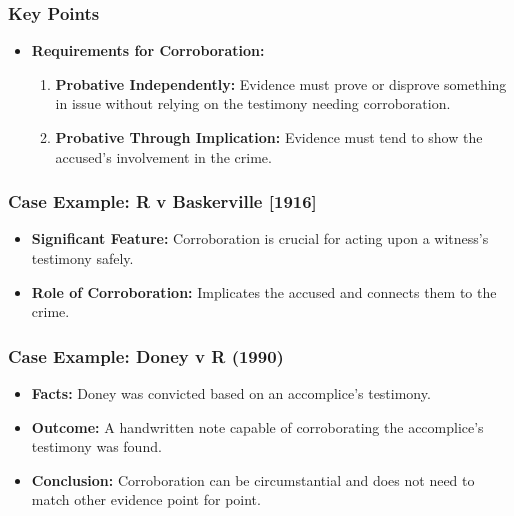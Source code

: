 \subsubsection{Key Points}\label{key-points-2}

\begin{itemize}
\tightlist
\item
  \textbf{Requirements for Corroboration:}

  \begin{enumerate}
  \def\labelenumi{\arabic{enumi}.}
  \tightlist
  \item
    \textbf{Probative Independently:} Evidence must prove or disprove
    something in issue without relying on the testimony needing
    corroboration.
  \item
    \textbf{Probative Through Implication:} Evidence must tend to show
    the accused's involvement in the crime.
  \end{enumerate}
\end{itemize}

\subsubsection{Case Example: R v Baskerville
{[}1916{]}}\label{case-example-r-v-baskerville-1916}

\begin{itemize}
\tightlist
\item
  \textbf{Significant Feature:} Corroboration is crucial for acting upon
  a witness's testimony safely.
\item
  \textbf{Role of Corroboration:} Implicates the accused and connects
  them to the crime.
\end{itemize}

\subsubsection{Case Example: Doney v R
(1990)}\label{case-example-doney-v-r-1990}

\begin{itemize}
\tightlist
\item
  \textbf{Facts:} Doney was convicted based on an accomplice's
  testimony.
\item
  \textbf{Outcome:} A handwritten note capable of corroborating the
  accomplice's testimony was found.
\item
  \textbf{Conclusion:} Corroboration can be circumstantial and does not
  need to match other evidence point for point.
\end{itemize}

